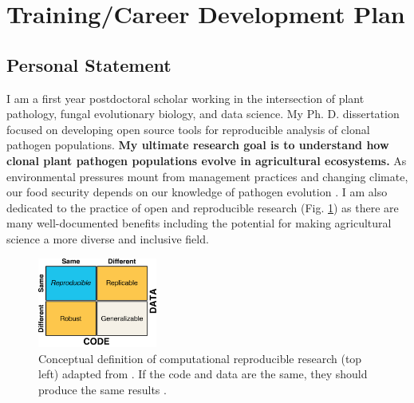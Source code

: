 \documentclass[12pt,letterpaper]{article}
\title{\ruleline{Project Narrative}}
\begin{document}
\maketitle


\section{Training/Career Development Plan}


\subsection{Personal Statement}

I am a first year postdoctoral scholar working in the intersection of plant pathology, fungal evolutionary biology, and data science. My Ph. D. dissertation focused on developing open source tools for reproducible analysis of clonal pathogen populations. 
\textbf{My ultimate research goal is to understand how clonal plant pathogen populations evolve in agricultural ecosystems.}
As environmental pressures mount from management practices and changing climate, our food security depends on our knowledge of pathogen evolution \citep{croll2016genetic,grunwald2016population,stukenbrock2013evolution}.
I am also dedicated to the practice of open and reproducible research (Fig. \ref{fig:rr-def}) as there are many well-documented benefits \citep{mckiernan2016open} including the potential for making agricultural science a more diverse and inclusive field.

\begin{figure}
  \includegraphics[width=0.35\textwidth]{figure/whitaker2017publishing.pdf}
  \caption{Conceptual definition of computational reproducible research (top left) adapted from \citet{whitaker2017publishing}. If the code and data are the same, they should produce the same results \citep{patil2016statistical}.
  }
  \label{fig:rr-def}
\end{figure}
\end{document}
